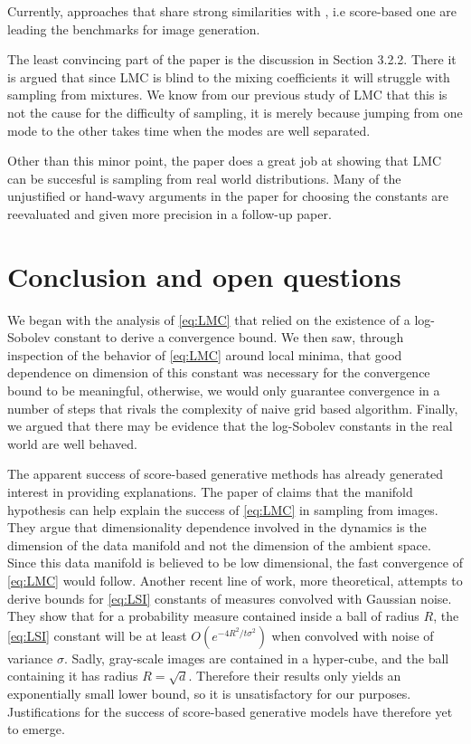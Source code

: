 \documentclass[10pt,journal,a4paper]{IEEEtran}
\theoremstyle{definition}
\begin{document}
Currently, approaches that share strong similarities with \cite{song_generative_2019}, i.e score-based  one are leading the benchmarks for image generation.

The least convincing part of the paper is the discussion in Section 3.2.2. There it is argued that since LMC is blind to the mixing coefficients it will struggle with sampling from mixtures. We know from our previous study of LMC that this is not the cause for the difficulty of sampling, it is merely because jumping from one mode to the other takes time when the modes are well separated.

Other than this minor point, the paper does a great job at showing that LMC can be succesful is sampling from real world distributions. Many of the unjustified or hand-wavy arguments in the paper for choosing the constants are reevaluated and given more precision in a follow-up paper. 

\section{Conclusion and open questions}

We began with the analysis of \eqref{eq:LMC} that relied on the existence of a log-Sobolev constant to derive a convergence bound. We then saw, through inspection of the behavior of \eqref{eq:LMC} around local minima, that good dependence on dimension of this constant was necessary for the convergence bound to be meaningful, otherwise, we would only guarantee convergence in a number of steps that rivals the complexity of naive grid based algorithm.  Finally, we argued that there may be evidence that the log-Sobolev constants in the real world are well behaved.

The apparent success of score-based generative methods has already generated interest in providing explanations. The paper of \cite{block_fast_2020} claims that the manifold hypothesis can help explain the success of \eqref{eq:LMC} in sampling from images. They argue that dimensionality dependence involved in the dynamics is the dimension of the data manifold and not the dimension of the ambient space. Since this data manifold is believed to be low dimensional, the fast convergence of \eqref{eq:LMC} would follow. Another recent line of work, more theoretical, attempts to derive bounds for \eqref{eq:LSI} constants of measures convolved with Gaussian noise. They show that for a probability measure contained inside a ball of radius $R$, the \eqref{eq:LSI} constant will be at least $O(e^{-4R^2/t\sigma^2})$ when convolved with noise of variance $\sigma$. Sadly, gray-scale images are contained in a hyper-cube, and the ball containing it has radius $R = \sqrt{d}$. Therefore their results only yields an exponentially small lower bound, so it is unsatisfactory for our purposes. Justifications for the success of score-based generative models have therefore yet to emerge.
\end{document}
